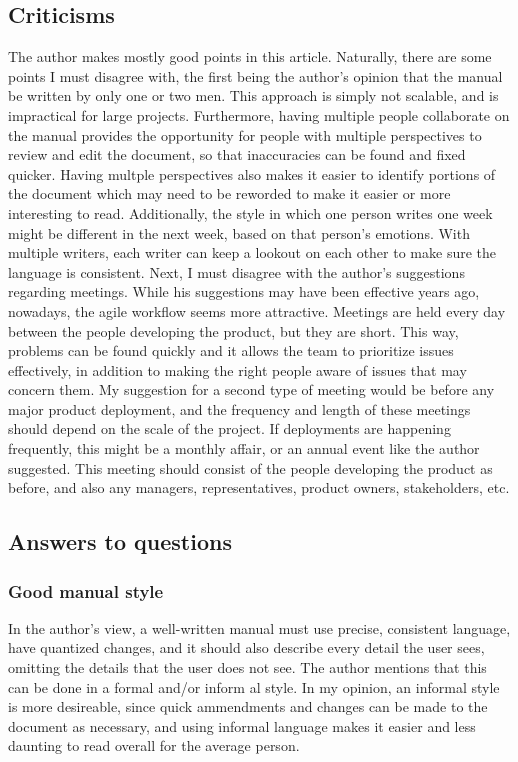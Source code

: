 \documentclass[letterpaper,12pt]{article}
\begin{document}
\subsection{Criticisms}
The author makes mostly good points in this article. Naturally, there are some
points I must disagree with, the first being the author's opinion that the
manual be written by only one or two men. This approach is simply not scalable,
and is impractical for large projects. Furthermore, having multiple people
collaborate on the manual provides the opportunity for people with multiple
perspectives to review and edit the document, so that inaccuracies can be found
and fixed quicker. Having multple perspectives also makes it easier to identify
portions of the document which may need to be reworded to make it easier or more
interesting to read. Additionally, the style in which one person writes one week
might be different in the next week, based on that person's emotions. With multiple
writers, each writer can keep a lookout on each other to make sure the language
is consistent. Next, I must disagree with the author's suggestions regarding
meetings. While his suggestions may have been effective years ago, nowadays, the
agile workflow seems more attractive. Meetings are held every day between the
people developing the product, but they are short. This way, problems can be
found quickly and it allows the team to prioritize issues effectively, in
addition to making the right people aware of issues that may concern them. My
suggestion for a second type of meeting would be before any major product
deployment, and the frequency and length of these meetings should depend on the
scale of the project. If deployments are happening frequently, this might be a
monthly affair, or an annual event like the author suggested. This meeting
should consist of the people developing the product as before, and also any
managers, representatives, product owners, stakeholders, etc.

\subsection{Answers to questions}
\subsubsection{Good manual style}

In the author's view, a well-written manual must use precise, consistent
language, have quantized changes, and  it should also describe every detail the
user sees, omitting the details that the user does not see. The author mentions
that this can be done in a formal and/or inform
al style. In my opinion, an
informal style is more desireable, since quick ammendments and changes can be made to
the document as necessary, and using informal language makes it easier and less
daunting to read overall for the average person.
\end{document}
